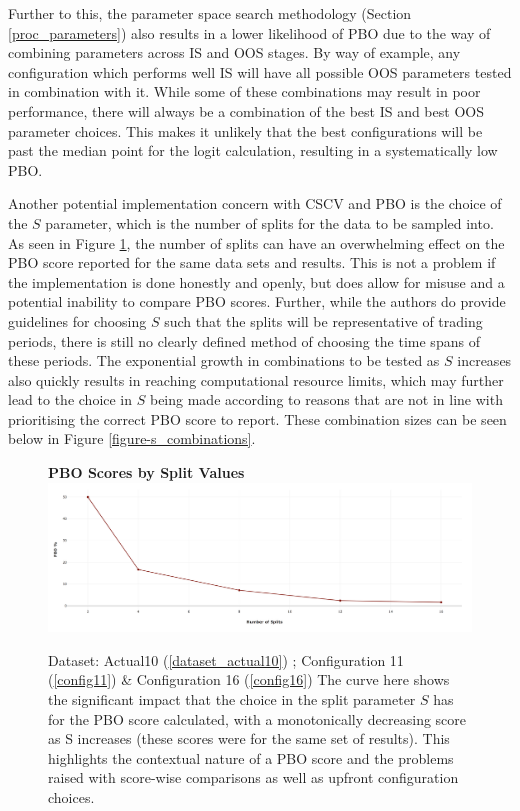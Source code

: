 \documentclass[a4paper,11pt,oneside]{article}
\theoremstyle{plain}
\theoremstyle{definition}
\begin{document}
	Further to this, the parameter space search methodology (Section \ref{proc_parameters}) also results in a lower likelihood of PBO due to the way of combining parameters across IS and OOS stages. By way of example, any configuration which performs well IS will have all possible OOS parameters tested in combination with it. While some of these combinations may result in poor performance, there will always be a combination of the best IS and best OOS parameter choices. This makes it unlikely that the best configurations will be past the median point for the logit calculation, resulting in a systematically low PBO.\newline
	
	Another potential implementation concern with CSCV and PBO is the choice of the $S$ parameter, which is the number of splits for the data to be sampled into. As seen in Figure \ref{figure-PBO_by_Split}, the number of splits can have an overwhelming effect on the PBO score reported for the same data sets and results. This is not a problem if the implementation is done honestly and openly, but does allow for misuse and a potential inability to compare PBO scores. Further, while the authors do provide guidelines for choosing $S$ such that the splits will be representative of trading periods, there is still no clearly defined method of choosing the time spans of these periods. The exponential growth in combinations to be tested as $S$ increases also quickly results in reaching computational resource limits, which may further lead to the choice in $S$ being made according to reasons that are not in line with prioritising the correct PBO score to report. These combination sizes can be seen below in Figure \ref{figure-s_combinations}.
	
	\begin{figure}[H]
		\centering 
		\textbf{PBO Scores by Split Values}
		\includegraphics[scale=0.25]{images/results/pbo/PBO_by_Split.png} 
		\caption[PBO Scores by Split Values]{Dataset: Actual10 (\ref{dataset_actual10}) ; Configuration 11 (\ref{config11}) \&  Configuration 16 (\ref{config16})
			\newline The curve here shows the significant impact that the choice in the split parameter $S$ has for the PBO score calculated, with a monotonically decreasing score as S increases (these scores were for the same set of results). This highlights the contextual nature of a PBO score and the problems raised with score-wise comparisons as well as upfront configuration choices. }
		\label{figure-PBO_by_Split}
	\end{figure}
	
\end{document}
